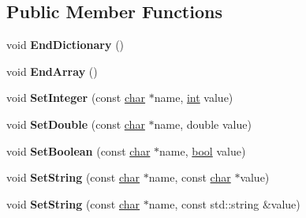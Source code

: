 \subsection*{Public Member Functions}
\begin{DoxyCompactItemize}
\item 
\mbox{\label{classv8_1_1tracing_1_1TracedValue_a8b667d6b3badd4861abd4b2d36e46448}} 
void {\bfseries End\+Dictionary} ()
\item 
\mbox{\label{classv8_1_1tracing_1_1TracedValue_a5d0e4c486e3ebe66715011230a4eb9a7}} 
void {\bfseries End\+Array} ()
\item 
\mbox{\label{classv8_1_1tracing_1_1TracedValue_a35f526aa62b6023861c424b46e194a47}} 
void {\bfseries Set\+Integer} (const \mbox{\hyperlink{classchar}{char}} $\ast$name, \mbox{\hyperlink{classint}{int}} value)
\item 
\mbox{\label{classv8_1_1tracing_1_1TracedValue_ae180e2446b5f09ee05f165d174e989f3}} 
void {\bfseries Set\+Double} (const \mbox{\hyperlink{classchar}{char}} $\ast$name, double value)
\item 
\mbox{\label{classv8_1_1tracing_1_1TracedValue_a83fcc073910f4af34b54c1ba7cd1da4c}} 
void {\bfseries Set\+Boolean} (const \mbox{\hyperlink{classchar}{char}} $\ast$name, \mbox{\hyperlink{classbool}{bool}} value)
\item 
\mbox{\label{classv8_1_1tracing_1_1TracedValue_adef953fcb330593b672db637fb0adacd}} 
void {\bfseries Set\+String} (const \mbox{\hyperlink{classchar}{char}} $\ast$name, const \mbox{\hyperlink{classchar}{char}} $\ast$value)
\item 
\mbox{\label{classv8_1_1tracing_1_1TracedValue_a7803988d232d9d0c2c6f48cf25ffc5d5}} 
void {\bfseries Set\+String} (const \mbox{\hyperlink{classchar}{char}} $\ast$name, const std\+::string \&value)
\item 
\mbox{\label{classv8_1_1tracing_1_1TracedValue_aed41b353b98d8ed34ae348223337f55f}} 

\end{DoxyCompactItemize}
